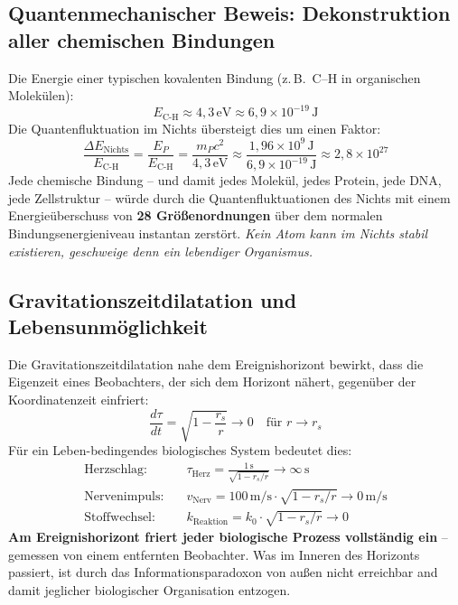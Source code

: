﻿\documentclass[12pt,a4paper]{report}
\begin{document}
\subsection{Quantenmechanischer Beweis: Dekonstruktion aller chemischen Bindungen}

Die Energie einer typischen kovalenten Bindung (z.\,B.\ C--H in organischen Molekülen):
\begin{equation}
    E_{\text{C-H}} \approx 4{,}3\,\text{eV} \approx 6{,}9 \times 10^{-19}\,\text{J}
    \label{eq:kovalente_bindung}
\end{equation}
Die Quantenfluktuation im Nichts übersteigt dies um einen Faktor:
\begin{equation}
    \frac{\Delta E_{\text{Nichts}}}{E_{\text{C-H}}} = \frac{E_P}{E_{\text{C-H}}} = \frac{m_P c^2}{4{,}3\,\text{eV}} \approx \frac{1{,}96 \times 10^9\,\text{J}}{6{,}9 \times 10^{-19}\,\text{J}} \approx 2{,}8 \times 10^{27}
    \label{eq:ueberlebensfaktor}
\end{equation}
Jede chemische Bindung -- und damit jedes Molekül, jedes Protein, jede DNA, jede Zellstruktur -- würde durch die Quantenfluktuationen des Nichts mit einem Energieüberschuss von \textbf{28 Größenordnungen} über dem normalen Bindungsenergieniveau instantan zerstört. \emph{Kein Atom kann im Nichts stabil existieren, geschweige denn ein lebendiger Organismus.}

\subsection{Gravitationszeitdilatation und Lebensunmöglichkeit}

Die Gravitationszeitdilatation nahe dem Ereignishorizont bewirkt, dass die Eigenzeit eines Beobachters, der sich dem Horizont nähert, gegenüber der Koordinatenzeit einfriert:
\begin{equation}
    \frac{d\tau}{dt} = \sqrt{1 - \frac{r_s}{r}} \longrightarrow 0 \quad \text{für } r \to r_s
    \label{eq:zeitdilatation_horizont}
\end{equation}
Für ein Leben-bedingendes biologisches System bedeutet dies:
\begin{align}
    \text{Herzschlag:} & \quad \tau_{\text{Herz}} = \frac{1\,\text{s}}{\sqrt{1-r_s/r}} \to \infty\,\text{s}\\
    \text{Nervenimpuls:} & \quad v_{\text{Nerv}} = 100\,\text{m/s} \cdot \sqrt{1-r_s/r} \to 0\,\text{m/s}\\
    \text{Stoffwechsel:} & \quad k_{\text{Reaktion}} = k_0 \cdot \sqrt{1 - r_s/r} \to 0
\end{align}
\textbf{Am Ereignishorizont friert jeder biologische Prozess vollständig ein} -- gemessen von einem entfernten Beobachter. Was im Inneren des Horizonts passiert, ist durch das Informationsparadoxon von außen nicht erreichbar and damit jeglicher biologischer Organisation entzogen.
\end{document}
